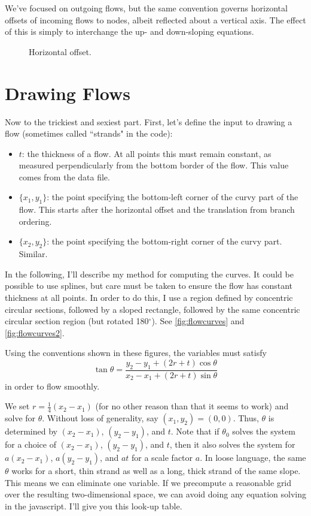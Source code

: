\documentclass[11pt]{article}
\begin{document}
We've focused on outgoing flows, but the same convention governs horizontal offsets of incoming flows to nodes, albeit reflected about a vertical axis.  The effect of this is simply to interchange the up- and down-sloping equations.

\begin{figure}
\caption{ Horizontal offset. \label{fig:horoff}}
\end{figure}




\section{Drawing Flows}
Now to the trickiest and sexiest part.  First, let's define the input to drawing a flow (sometimes called ``strands" in the code):
\begin{itemize}
\item $t$: the thickness of a flow.  At all points this must remain constant, as measured perpendicularly from the bottom border of the flow.  This value comes from the data file.
\item $\{x_1, y_1\}$: the point specifying the bottom-left corner of the curvy part of the flow.  This starts after the horizontal offset and the translation from branch ordering.
\item $\{x_2, y_2\}$: the point specifying the bottom-right corner of the curvy part.  Similar.
\end{itemize}

In the following, I'll describe my method for computing the curves.  It could be possible to use splines, but care must be taken to ensure the flow has constant thickness at all points.  In order to do this, I use a region defined by concentric circular sections, followed by a sloped rectangle, followed by the same concentric circular section region (but rotated 180$^\circ$).  See \autoref{fig:flowcurves} and \autoref{fig:flowcurves2}.

Using the conventions shown in these figures, the variables must satisfy
\begin{equation*}
\tan{\theta} = \frac{y_2 - y_1 + (2r+t)\cos{\theta}}{x_2 - x_1 + (2r+t)\sin{\theta}}
\end{equation*}
in order to flow smoothly.

We set $r=\frac{1}{4}(x_2 - x_1)$ (for no other reason than that it seems to work) and solve for $\theta$.  Without loss of generality, say $(x_1,y_2) = (0,0)$.  Thus, $\theta$ is determined by $(x_2 - x_1)$, $(y_2-y_1)$, and $t$.  Note that if $\theta_0$ solves the system for a choice of $(x_2 - x_1)$, $(y_2-y_1)$, and $t$, then it also solves the system for $a(x_2 - x_1)$, $a(y_2-y_1)$, and $at$ for a scale factor $a$.  In loose language, the same $\theta$ works for a short, thin strand as well as a long, thick strand of the same slope.  This means we can eliminate one variable.  If we precompute a reasonable grid over the resulting two-dimensional space, we can avoid doing any equation solving in the javascript.  I'll give you this look-up table.
\end{document}
